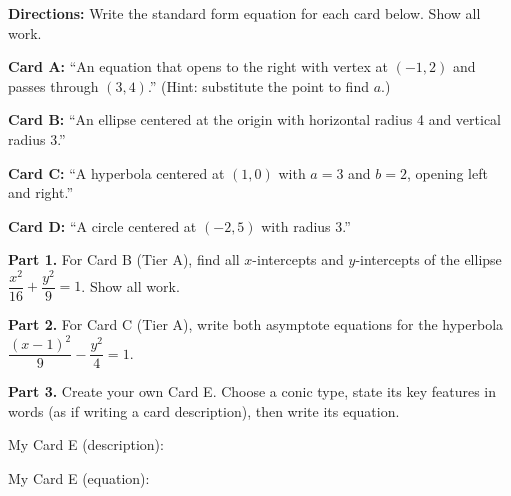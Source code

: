 \documentclass[10pt]{article}
\begin{document}
\begin{tcolorbox}[colback=white, colframe=black!40,
    title=\textbf{Tier A --- Approaching Proficiency},
    fonttitle=\bfseries, arc=2mm, left=3mm, right=3mm, top=2mm, bottom=2mm]

\textbf{Directions:} Write the standard form equation for each card below.
Show all work.

\vspace{6pt}
\textbf{Card A:} ``An equation that opens to the right with vertex at
$(-1, 2)$ and passes through $(3, 4)$.'' (Hint: substitute the point to find $a$.)


\textbf{Card B:} ``An ellipse centered at the origin with horizontal radius 4
and vertical radius 3.''


\textbf{Card C:} ``A hyperbola centered at $(1, 0)$ with $a = 3$ and $b = 2$,
opening left and right.''


\textbf{Card D:} ``A circle centered at $(-2, 5)$ with radius 3.''


\end{tcolorbox}

\vspace{0.10in}

\begin{tcolorbox}[colback=white, colframe=black!40,
    title=\textbf{Tier E --- Extension},
    fonttitle=\bfseries, arc=2mm, left=3mm, right=3mm, top=2mm, bottom=2mm]

\textbf{Part 1.} For Card B (Tier A), find all $x$-intercepts and
$y$-intercepts of the ellipse $\dfrac{x^2}{16} + \dfrac{y^2}{9} = 1$.
Show all work.


\textbf{Part 2.} For Card C (Tier A), write both asymptote equations for the
hyperbola $\dfrac{(x-1)^2}{9} - \dfrac{y^2}{4} = 1$.


\textbf{Part 3.} Create your own Card E. Choose a conic type, state its key
features in words (as if writing a card description), then write its equation.

\vspace{4pt}
My Card E (description): 

My Card E (equation): 

\end{tcolorbox}
\end{document}
